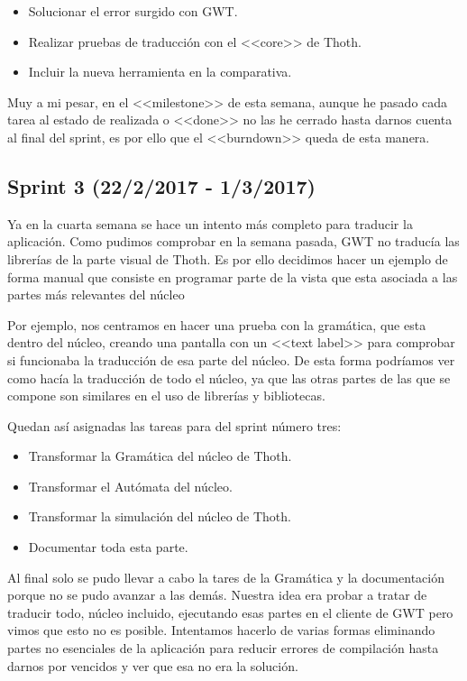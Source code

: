 \begin{itemize}
\item Solucionar el error surgido con GWT.
\item Realizar pruebas de traducción con el <<core>> de Thoth.
\item Incluir la nueva herramienta en la comparativa.
\end{itemize}

Muy a mi pesar, en el <<milestone>> de esta semana, aunque he pasado cada tarea al estado de realizada o <<done>> no las he cerrado hasta darnos cuenta al final del sprint, es por ello que el <<burndown>> queda de esta manera.


\subsection{Sprint 3 (22/2/2017 - 1/3/2017)}

Ya en la cuarta semana se hace un intento más completo para traducir la aplicación. Como pudimos comprobar en la semana pasada, GWT no traducía las librerías de la parte visual de Thoth. Es por ello decidimos hacer un ejemplo de forma manual que consiste en programar parte de la vista que esta asociada a las partes más relevantes del núcleo

Por ejemplo, nos centramos en hacer una prueba con la gramática, que esta dentro del núcleo, creando una pantalla con un <<text label>> para comprobar si funcionaba la traducción de esa parte del núcleo. De esta forma podríamos ver como hacía la traducción de todo el núcleo, ya que las otras partes de las que se compone son similares en el uso de librerías y bibliotecas.

Quedan así asignadas las tareas para del sprint número tres:

\begin{itemize}
\item Transformar la Gramática del núcleo de Thoth.
\item Transformar el Autómata del núcleo.
\item Transformar la simulación del núcleo de Thoth.
\item Documentar toda esta parte.
\end{itemize}

Al final solo se pudo llevar a cabo la tares de la Gramática y la documentación porque no se pudo avanzar a las demás. Nuestra idea era probar a tratar de traducir todo, núcleo incluido, ejecutando esas partes en el cliente de GWT  pero vimos que esto no es posible. Intentamos hacerlo de varias formas eliminando partes no esenciales de la aplicación para reducir errores de compilación hasta darnos por vencidos y ver que esa no era la solución.

